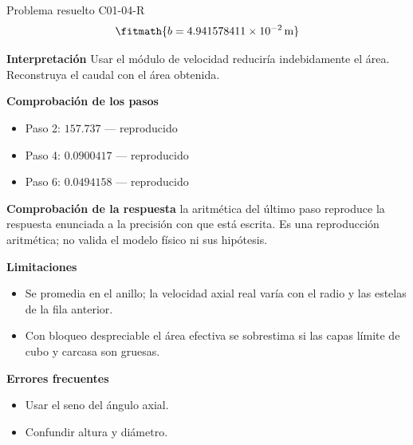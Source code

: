 \documentclass[10pt,openany]{book}
\begin{document}
\begin{studiumworked}{Problema resuelto C01-04-R}
\[
\fitmath{b=4.941578411\times10^{-2}\,\mathrm{m}}
\]

\noindent\textbf{Interpretación}
Usar el módulo de velocidad reduciría indebidamente el área. Reconstruya el caudal con el área obtenida.

\noindent\textbf{Comprobación de los pasos}
\begin{itemize}
\item Paso 2: $157.737$ — reproducido
\item Paso 4: $0.0900417$ — reproducido
\item Paso 6: $0.0494158$ — reproducido
\end{itemize}

\noindent\textbf{Comprobación de la respuesta} la aritmética del último paso reproduce la respuesta enunciada a la precisión con que está escrita. Es una reproducción aritmética; no valida el modelo físico ni sus hipótesis.

\noindent\textbf{Limitaciones}
\begin{itemize}
\item Se promedia en el anillo; la velocidad axial real varía con el radio y las estelas de la fila anterior.
\item Con bloqueo despreciable el área efectiva se sobrestima si las capas límite de cubo y carcasa son gruesas.
\end{itemize}

\noindent\textbf{Errores frecuentes}
\begin{itemize}
\item Usar el seno del ángulo axial.
\item Confundir altura y diámetro.
\end{itemize}
\end{studiumworked}
\end{document}
